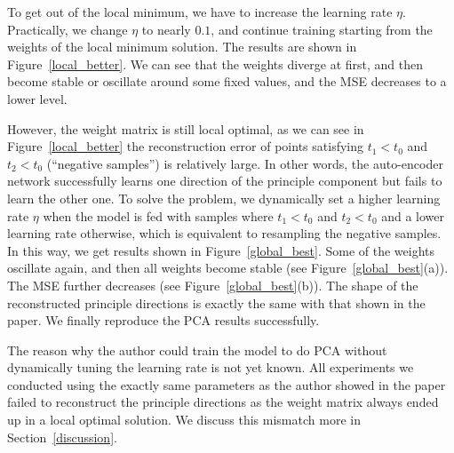 To get out of the local minimum, we have to increase the learning rate $\eta$. 
Practically, we change $\eta$ to nearly $0.1$, and continue training starting from the weights of 
the local minimum solution. The results are shown in Figure~\ref{local_better}.
We can see that the weights diverge at first, and then become stable or oscillate around some fixed values,
and the MSE decreases to a lower level.

However, the weight matrix is still local optimal, 
as we can see in Figure~\ref{local_better} the reconstruction error of points
satisfying $t_1 < t_0$ and $t_2 < t_0$ (``negative samples'') is relatively large. 
In other words, the auto-encoder network successfully learns one direction of the principle component but fails
to learn the other one. To solve the problem, we dynamically set a higher learning rate $\eta$ when
the model is fed with samples where $t_1 < t_0$ and $t_2 < t_0$ and a lower learning rate otherwise,
which is equivalent to resampling the negative samples.
In this way, we get results shown in Figure~\ref{global_best}.
Some of the weights oscillate again, and then all weights become stable (see Figure~\ref{global_best}(a)).
The MSE further decreases (see Figure~\ref{global_best}(b)).
The shape of the reconstructed principle directions is exactly the same with that shown in the paper.
We finally reproduce the PCA results successfully.

The reason why the author could train the model to do PCA without dynamically tuning the learning rate is not yet known.
All experiments we conducted using the exactly same parameters as the author showed in the paper failed to reconstruct the principle directions as the weight matrix always ended up in a local optimal solution.
We discuss this mismatch more in Section~\ref{discussion}.

